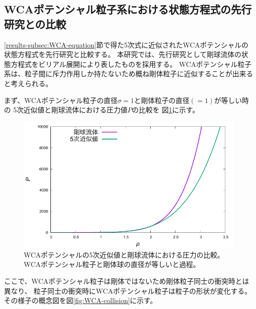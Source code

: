 \documentclass[titlepage]{jsreport}
\begin{document}
{{{\subsection{WCAポテンシャル粒子系における状態方程式の先行研究との比較}\label{results-subsec:previous-research}
\ref{results-subsec:WCA-equation}節で得た5次式に近似されたWCAポテンシャルの状態方程式を先行研究と比較する。
本研究では、先行研究として剛球流体の状態方程式をビリアル展開により表したものを採用する\cite{hard-sphere}。
WCAポテンシャル粒子系は、粒子間に斥力作用しか持たないため概ね剛体粒子に近似することが出来ると考えられる。

まず、WCAポテンシャル粒子の直径$\sigma=1$と剛体粒子の直径$(=1)$が等しい時の
5次近似値と剛球流体における圧力値$P$の比較を
図\ref{fig:compare_previous-research}に示す。

\begin{figure}[htbp]
    \begin{center}
        \includegraphics[width=14cm]{fig/compare_previous-research.pdf}
    \end{center}
    \caption{WCAポテンシャルの5次近似値と剛球流体における圧力の比較。WCAポテンシャル粒子と剛体球の直径が等しいと過程。}
    \label{fig:compare_previous-research}
\end{figure}

\newpage
ここで、WCAポテンシャル粒子は剛体ではないため剛体粒子同士の衝突時とは異なり、
粒子同士の衝突時にWCAポテンシャル粒子は粒子の形状が変化する。
その様子の概念図を図\ref{fig:WCA-collision}に示す。

}}}
\end{document}
